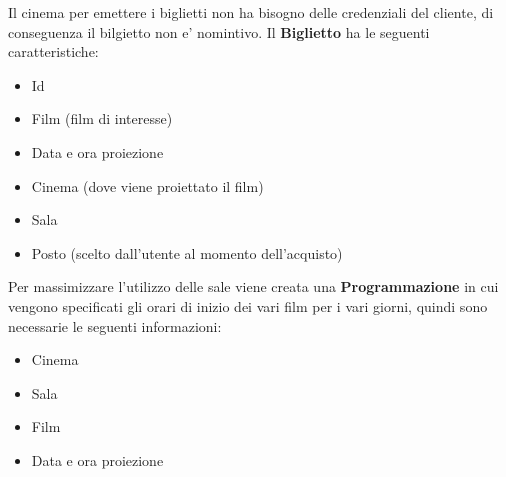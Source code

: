 \documentclass[10pt]{article}
\begin{document}
	Il cinema per emettere i biglietti non ha bisogno delle credenziali del cliente, di conseguenza il bilgietto non e' nomintivo. Il {\bf Biglietto} ha le seguenti caratteristiche:
	\begin{itemize}	
		\item Id	
		\item Film (film di interesse)
		\item Data e ora proiezione
		\item Cinema (dove viene proiettato il film)
		\item Sala
		\item Posto (scelto dall'utente al momento dell'acquisto)
	\end{itemize}
 	Per massimizzare l'utilizzo delle sale viene creata una \textbf{Programmazione} in cui vengono specificati gli orari di inizio dei vari film per i vari giorni, quindi sono necessarie le seguenti informazioni:
 	\begin{itemize}
 		\item Cinema
 		\item Sala
 		\item Film
 		\item Data e ora proiezione
 	\end{itemize} 
\end{document}
